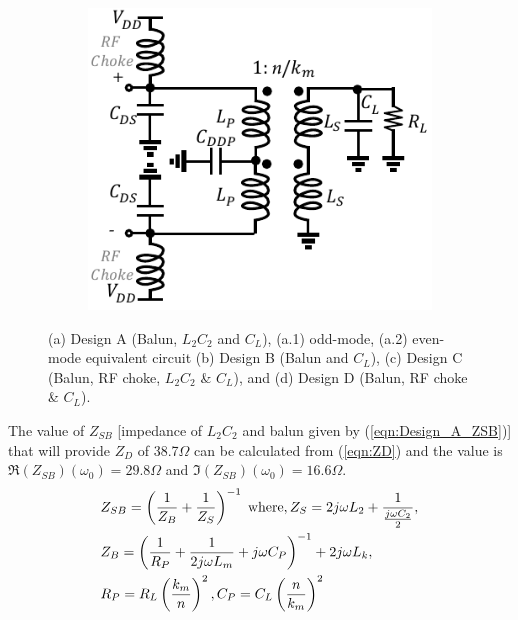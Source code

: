 \documentclass[conference]{IEEEtran}
\begin{document}
\begin{figure}[!t]
\begin{subfigure}{0.24\textwidth}
\includegraphics[width=1\textwidth]{Images/Design/Design_D_FC.pdf}
\caption{}
\label{fig:Design_D_FC}
\end{subfigure}
\caption{(a) Design A (Balun, $L_2C_2$ and $C_L$), (a.1) odd-mode, (a.2) even-mode equivalent circuit (b) Design B (Balun and $C_L$), (c) Design C (Balun, RF choke, $L_2C_2$ \& $C_L$), and (d) Design D (Balun, RF choke \& $C_L$).}
\label{fig:Design_A_B_C_D}
\vspace{-0.25in}
\end{figure}

The value of $Z_{SB}$ [impedance of $L_2C_2$ and balun given by (\ref{eqn:Design_A_ZSB})] that will provide $Z_D$ of 38.7$\Omega$ can be calculated from (\ref{eqn:ZD}) and the value is $\Re(Z_{SB})(\omega_0) =  29.8\Omega$ and $\Im(Z_{SB})(\omega_0) = 16.6\Omega$.
\vspace{-0.05in}
\begin{equation}
\begin{aligned}
    &Z_{SB}=\left(\frac{1}{Z_B}+\frac{1}{Z_S}\right)^{-1}
    \hspace{1mm}\text{where}, Z_S=2j\omega  L_2+\frac{1}{\frac{j \omega C_2}{2}}, \\
    &Z_B=\left(\frac{1}{R_P}+\frac{1}{2j \omega  L_m}+j \omega C_P\right)^{-1}+2j \omega  L_k,\\ &R_P=R_L\left(\frac{k_m}{n}\right)^2,C_P=C_L\left(\frac{n}{k_m}\right)^2
\label{eqn:Design_A_ZSB}
\end{aligned}
\end{equation}
\end{document}
